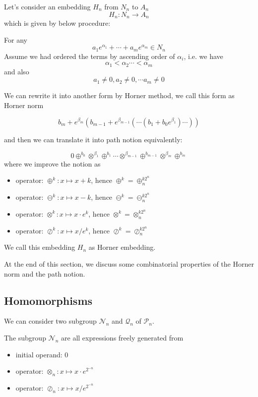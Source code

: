 \documentclass{article}
\begin{document}
Let's consider an embedding $H_n$ from $N_n$ to $A_n$
$$ H_n: N_n \to A_n $$
which is given by below procedure:

For any
$$
a_1 e^{\alpha_1} + \cdots + a_m e^{\alpha_m} \in N_n
$$
Assume we had ordered the terms by ascending order of $\alpha_i$, i.e. we have
$$
\alpha_1  < \alpha_2 \cdots < \alpha_m
$$
and also
$$
a_1 \neq 0, a_2 \neq 0, \cdots a_m \neq 0
$$

We can rewrite it into another form by Horner method, we call this form as Horner norm

$$
b_m + e^{\beta_m} (b_{m-1} + e^{\beta_{m-1}} ( \cdots (b_1 + b_0 e^{\beta_1}) \cdots ))
$$

and then we can translate it into path notion equivalently:

$$
0 \oplus^{b_0} \otimes^{\beta_1} \oplus^{b_1} \cdots \otimes^{\beta_{m-1}} \oplus^{b_{m-1}} \otimes^{\beta_m} \oplus^{b_m}
$$
where we improve the notion as
\begin{itemize}
    \item operator: $\oplus^k: x \mapsto x + k$, hence $\oplus^k = \oplus_n^{k2^n}$
    \item operator: $\ominus^k: x \mapsto x - k$, hence $\ominus^k = \ominus_n^{k2^n}$
    \item operator: $\otimes^k: x \mapsto x \cdot e^k$, hence $\otimes^k = \otimes_n^{k2^n}$
    \item operator: $\oslash^k: x \mapsto x / e^k$, hence $\oslash^k = \oslash_n^{k2^n}$
\end{itemize}

We call this embedding $H_n$ as Horner embedding.

At the end of this section, we discuss some combinatorial properties of the Horner norm and the path notion.

\subsection{Homomorphisms}\label{sec:homomorphisms}

We can consider two subgroup $\mathcal{N}_n$ and $\mathcal{Q}_n$ of $\mathcal{P}_n$.

The subgroup $\mathcal{N}_n$ are all expressions freely generated from
\begin{itemize}
    \item initial operand: $0$
    \item operator: $\otimes_n: x \mapsto x \cdot e^{2^{-n}}$
    \item operator: $\oslash_n: x \mapsto x / e^{2^{-n}}$
\end{itemize}
\end{document}
